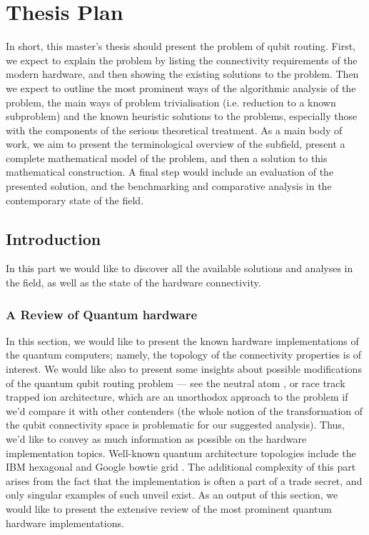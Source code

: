 \chapter{Thesis Plan}


In short, this master's thesis should present the problem of qubit routing. First, we expect to explain the problem by listing the connectivity requirements of the modern hardware, and then showing the existing solutions to the problem. Then we expect to outline the most prominent ways of the algorithmic analysis of the problem, the main ways of problem trivialisation (i.e. reduction to a known subproblem) and the known heuristic solutions to the problems, especially those with the components of the serious theoretical treatment. As a main body of work, we aim to present the terminological overview of the subfield, present a complete mathematical model of the problem,  and then a solution to this mathematical construction. A final step would include an evaluation of the presented solution, and the benchmarking and comparative analysis in the contemporary state of the field. 

\section{Introduction}

In this part we would like to discover all the available solutions and analyses in the field, as well as the state of the hardware connectivity.

\subsection{A Review of Quantum hardware}
In this section, we would like to present the known hardware implementations of the quantum computers; namely, the topology of the connectivity properties is of interest. We would like also to present some insights about possible modifications of the quantum qubit routing problem --- see the neutral atom \cite{wangAtomiqueQuantumCompiler2024}, or race track \cite{mosesRaceTrackTrappedIon2023} trapped ion architecture, which are an unorthodox approach to the problem if we'd compare it with other contenders (the whole notion of the transformation of the qubit connectivity space is problematic for our suggested analysis). Thus, we'd like to convey as much information as possible on the hardware implementation topics. Well-known quantum architecture topologies include the IBM hexagonal \cite{IBMQuantumHeavy} and Google bowtie grid \cite{aruteQuantumSupremacyUsing2019}. The additional complexity of this part arises from the fact that the implementation is often a part of a trade secret, and only singular examples of such unveil exist. As an output of this section, we would like to present the extensive review of the most prominent quantum hardware implementations. 


